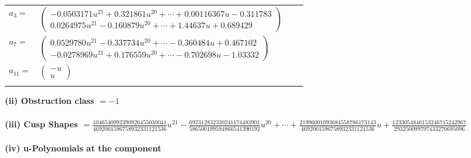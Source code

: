 \documentclass[1p]{elsarticle_modified}
\theoremstyle{definition}
\begin{document}
\begin{tabular}{m{7pt} m{180pt} m{7pt} m{180pt} }
\flushright $a_{3}=$&$\begin{pmatrix}-0.0503171 u^{21}+0.321861 u^{20}+\cdots+0.00116367 u-0.311783\\0.0264975 u^{21}-0.160879 u^{20}+\cdots+1.44637 u+0.689429\end{pmatrix}$ \\
\flushright $a_{7}=$&$\begin{pmatrix}0.0529780 u^{21}-0.337734 u^{20}+\cdots-0.360484 u+0.467102\\-0.0278969 u^{21}+0.176559 u^{20}+\cdots-0.702698 u-1.03332\end{pmatrix}$ \\
\flushright $a_{11}=$&$\begin{pmatrix}- u\\u\end{pmatrix}$\\&\end{tabular}
\flushleft \textbf{(ii) Obstruction class $= -1$}\\~\\
\flushleft \textbf{(iii) Cusp Shapes $= \frac{1046540992390926455030041}{4692001596758932331121536} u^{21}-\frac{692312832330241174483901}{586500199594866541390192} u^{20}+\cdots+\frac{21996001093684558786173143}{4692001596758932331121536} u+\frac{1233054846153246715242967}{293250099797433270695096}$}\\~\\
\newpage\renewcommand{\arraystretch}{1}
\flushleft \textbf{(iv) u-Polynomials at the component}\newline \\
\end{document}
